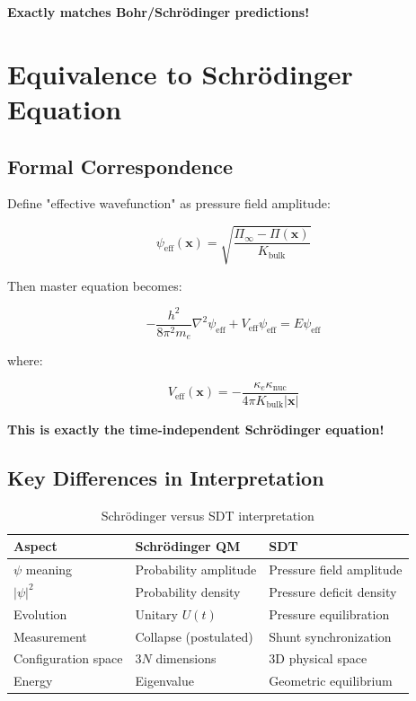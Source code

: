\textbf{Exactly matches Bohr/Schrödinger predictions!}

\section{Equivalence to Schrödinger Equation}

\subsection{Formal Correspondence}

Define "effective wavefunction" as pressure field amplitude:

\begin{equation}
\psi_{\text{eff}}(\mathbf{x}) = \sqrt{\frac{\Pi_\infty - \Pi(\mathbf{x})}{K_{\text{bulk}}}}
\end{equation}

Then master equation becomes:

\begin{equation}
-\frac{h^2}{8\pi^2 m_e} \nabla^2 \psi_{\text{eff}} + V_{\text{eff}} \psi_{\text{eff}} = E \psi_{\text{eff}}
\end{equation}

where:

\begin{equation}
V_{\text{eff}}(\mathbf{x}) = -\frac{\kappa_e \kappa_{\text{nuc}}}{4\pi K_{\text{bulk}} |\mathbf{x}|}
\end{equation}

\textbf{This is exactly the time-independent Schrödinger equation!}

\subsection{Key Differences in Interpretation}

\begin{table}[h]
\centering
\begin{tabular}{|l|l|l|}
\hline
\textbf{Aspect} & \textbf{Schrödinger QM} & \textbf{SDT} \\
\hline
$\psi$ meaning & Probability amplitude & Pressure field amplitude \\
$|\psi|^2$ & Probability density & Pressure deficit density \\
Evolution & Unitary $U(t)$ & Pressure equilibration \\
Measurement & Collapse (postulated) & Shunt synchronization \\
Configuration space & $3N$ dimensions & 3D physical space \\
Energy & Eigenvalue & Geometric equilibrium \\
\hline
\end{tabular}
\caption{Schrödinger versus SDT interpretation}
\end{table}

